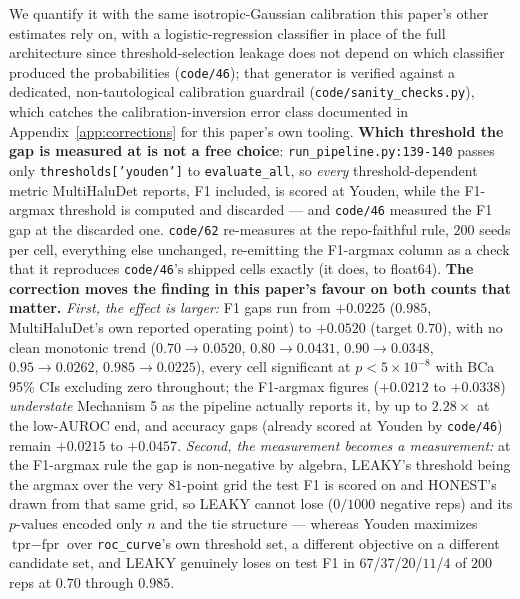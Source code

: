 \documentclass[10pt]{article} %
\begin{document}
We quantify it with the same isotropic-Gaussian calibration this paper's other
estimates rely on, with a logistic-regression classifier in place of the full
architecture since threshold-selection leakage does not depend on which
classifier produced the probabilities (\texttt{code/46}); that generator is
verified against a dedicated, non-tautological calibration guardrail
(\texttt{code/sanity\_checks.py}), which catches the calibration-inversion
error class documented in Appendix~\ref{app:corrections} for this paper's
own tooling. \textbf{Which threshold the
gap is measured at is not a free choice}: \texttt{run\_pipeline.py:139-140}
passes only \texttt{thresholds['youden']} to \texttt{evaluate\_all}, so
\emph{every} threshold-dependent metric MultiHaluDet reports, F1 included, is
scored at Youden, while the F1-argmax threshold is computed and discarded ---
and \texttt{code/46} measured the F1 gap at the discarded one. \texttt{code/62}
re-measures at the repo-faithful rule, $200$ seeds per cell, everything else
unchanged, re-emitting the F1-argmax column as a check that it reproduces
\texttt{code/46}'s shipped cells exactly (it does, to float64). \textbf{The
correction moves the finding in this paper's favour on both counts that
matter.} \emph{First, the effect is larger:} F1 gaps run from $+0.0225$
($0.985$, MultiHaluDet's own reported operating point) to $+0.0520$ (target
$0.70$), with no clean monotonic trend ($0.70{\to}0.0520$, $0.80{\to}0.0431$,
$0.90{\to}0.0348$, $0.95{\to}0.0262$, $0.985{\to}0.0225$), every cell
significant at $p<5\times10^{-8}$ with BCa 95\% CIs excluding zero throughout;
the F1-argmax figures ($+0.0212$ to $+0.0338$) \emph{understate} Mechanism 5 as
the pipeline actually reports it, by up to $\mathbf{2.28\times}$ at the
low-AUROC end, and accuracy gaps (already scored at Youden by \texttt{code/46})
remain $+0.0215$ to $+0.0457$. \emph{Second, the measurement becomes a
measurement:} at the F1-argmax rule the gap is non-negative by algebra, LEAKY's
threshold being the argmax over the very $81$-point grid the test F1 is scored
on and HONEST's drawn from that same grid, so LEAKY cannot lose ($0/1000$
negative reps) and its $p$-values encoded only $n$ and the tie structure ---
whereas Youden maximizes $\text{tpr}-\text{fpr}$ over \texttt{roc\_curve}'s own
threshold set, a different objective on a different candidate set, and LEAKY
genuinely loses on test F1 in $67$/$37$/$20$/$11$/$4$ of $200$ reps at $0.70$
through $0.985$.
\end{document}
